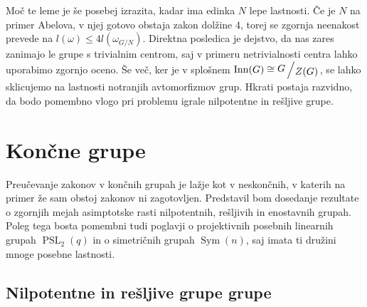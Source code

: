 \documentclass[12pt,a4paper]{article}
\newcounter{theoremcounter}[section] %
\newtheorem{definicija}[theoremcounter]{Definicija}
\newcommand{\quot}[2]{{\raisebox{0.1em}{$#1$}\left/\raisebox{-0.2em}{$#2$}\right.}}
\begin{document}
\noindent
Moč te leme je še posebej izrazita, kadar ima edinka $N$ lepe lastnosti. Če je $N$ na primer Abelova, v njej gotovo obstaja zakon dolžine $4$, torej se zgornja neenakost prevede na $l(\omega) \le 4 l(\omega_{G/N})$. Direktna posledica je dejstvo, da
nas zares zanimajo le grupe s trivialnim centrom, saj v primeru netrivialnosti centra lahko uporabimo zgornjo oceno. Še več, ker je v splošnem $\operatorname{Inn}(G) \cong \quot{G}{Z(G)}$, se lahko sklicujemo na lastnosti notranjih avtomorfizmov grup. Hkrati postaja razvidno, da bodo pomembno vlogo pri problemu igrale nilpotentne in rešljive grupe.

\section{Končne grupe}
Preučevanje zakonov v končnih grupah je lažje kot v neskončnih, v katerih na primer že sam obstoj zakonov ni zagotovljen. Predstavil bom dosedanje rezultate o zgornjih mejah asimptotske rasti nilpotentnih, rešljivih in enostavnih grupah. Poleg tega bosta pomembni tudi poglavji o
projektivnih posebnih linearnih grupah $\operatorname{PSL}_2(q)$ in o simetričnih grupah $\operatorname{Sym}(n)$, saj imata ti družini mnoge posebne lastnosti.

\subsection{Nilpotentne in rešljive grupe grupe}


\end{document}
